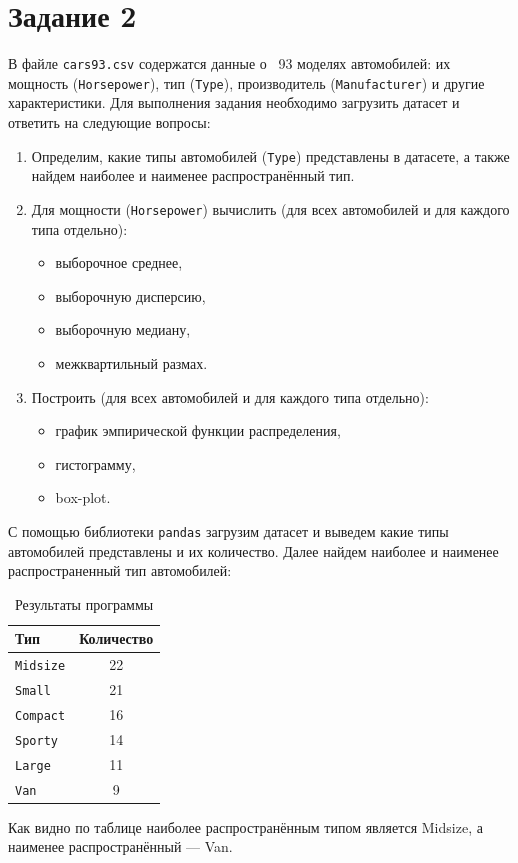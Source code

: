 \documentclass[a4paper,12pt]{article}
\begin{document}
\section*{Задание 2}
В файле \texttt{cars93.csv} содержатся данные о ~93 моделях автомобилей: их мощность (\texttt{Horsepower}), тип (\texttt{Type}), производитель (\texttt{Manufacturer}) и другие характеристики. Для выполнения задания необходимо загрузить датасет и ответить на следующие вопросы:
\begin{enumerate}
    \item Определим, какие типы автомобилей (\texttt{Type}) представлены в датасете, а также найдем наиболее и наименее распространённый тип.
    \item Для мощности (\texttt{Horsepower}) вычислить (для всех автомобилей и для каждого типа отдельно): 
          \begin{itemize}
              \item выборочное среднее, 
              \item выборочную дисперсию, 
              \item выборочную медиану, 
              \item межквартильный размах.
          \end{itemize}
    \item Построить (для всех автомобилей и для каждого типа отдельно):
          \begin{itemize}
              \item график эмпирической функции распределения,
              \item гистограмму,
              \item box-plot.
          \end{itemize}
\end{enumerate}

С помощью библиотеки \texttt{pandas} загрузим датасет и выведем какие типы автомобилей представлены и их количество. Далее найдем наиболее и наименее распространенный тип автомобилей:
\begin{table}[H]
    \centering
    \begin{tabular}{|l|c|}
        \hline
        \textbf{Тип} & \textbf{Количество} \\
        \hline
        \texttt{Midsize} & 22 \\
        \texttt{Small}   & 21 \\
        \texttt{Compact} & 16 \\ 
        \texttt{Sporty}  & 14 \\
        \texttt{Large}   & 11 \\
        \texttt{Van}     & 9  \\
        \hline
    \end{tabular}
    \caption{Результаты программы}
\end{table}
Как видно по таблице наиболее распространённым типом является Midsize, а наименее распространённый --- Van.
\end{document}
